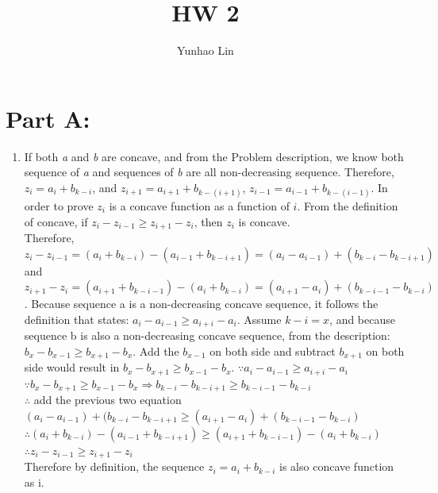 \documentclass{article}
\title{HW 2}
\author{Yunhao Lin}
\begin{document}
\maketitle
\section{Part A:}
\begin{enumerate}
\item    If both \textit{a} and \textit{b} are concave, and from the Problem 
 description, we know both sequence of \textit{a} and sequences of \textit{b} 
 are all non-decreasing sequence. Therefore,$z_i = a_i + b_{k-i}$, and $z_{i+1}
 = a_{i+1} + b_{k-(i+1)}$, $z_{i-1} = a_{i-1} + b_{k-(i-1)}$. In order to prove
 $z_i$ is a concave function as a function of $i$. From the definition of concave,
 if $z_i - z_{i-1} \geq z_{i+1} - z_i$, then $z_i$ is concave.\\
 Therefore, $z_i - z_{i-1} = (a_i + b_{k-i})-(a_{i-1} + b_{k-i+1}) = (a_i - a_{i-1}) + 
 (b_{k-i} - b_{k-i+1})$ and $z_{i+1} - z_i = (a_{i+1}+b_{k-i-1}) - (a_i + b_{k-i}) 
 = (a_{i+1} - a_i) + (b_{k-i-1} - b_{k-i})$. Because sequence a is a non-decreasing
 concave sequence, it follows the definition that states: $a_i - a_{i-1} \geq 
 a_{i+i} - a_i$. Assume $ k - i = x $, and because sequence b is also a 
 non-decreasing concave sequence, from the description: $b_x - b_{x-1} \geq 
 b_{x+1}-b_x$. Add the $b_{x-1}$ on both side and subtract $b_{x+1}$ on both 
 side would result in $b_x - b_{x+1} \geq b_{x-1}-b_x$.
 $\because a_i - a_{i-1} \geq a_{i+i} - a_i $ \\
 $\because b_x - b_{x+1} \geq b_{x-1}-b_x \Rightarrow b_{k-i} -b_{k-i+1} \geq 
 b_{k-i-1} - b_{k-i}$\\$\therefore $ add the previous two equation $(a_i - a_{i-1}) 
 + (b_{k-i} - b_{k-i+1} \geq (a_{i+1} - a_i)+ (b_{k-i-1} - b_{k-i})$\\
 $\therefore (a_i + b_{k-i})-(a_{i-1} + b_{k-i+1}) \geq (a_{i+1}+b_{k-i-1}) - 
 (a_i + b_{k-i})$\\ $\therefore z_i - z_{i-1} \geq z_{i+1} - z_i$ \\
 Therefore by definition, the sequence $z_i = a_i +b_{k-i}$ is also concave function as i.


\end{enumerate}
\end{document}
